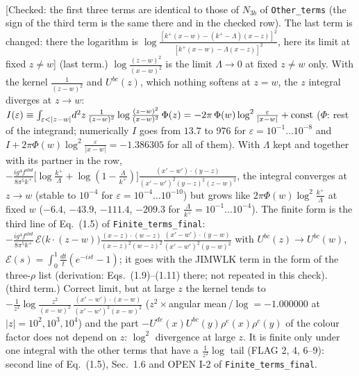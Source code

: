 \documentclass[9pt]{article}
\numberwithin{equation}{section}
\begin{document}
\begin{align}
\end{align} {\color{red}[Checked: the first three terms are identical to those of $N_{3b}$ of \texttt{Other\_terms} (the sign of the third term is the same there and in the checked row). The last term is changed: there the logarithm is $\log\frac{[k^{+}(x-w)-(k^{+}-\Lambda)(x-z)]^{2}}{[k^{+}(x-w)-\Lambda(x-z)]^{2}}$, here its limit at fixed $z\neq w$]} {\color{magenta} (last term.) $\log\frac{(z-w)^{2}}{(x-w)^{2}}$ is the limit $\Lambda\to0$ at fixed $z\neq w$ only. With the kernel $\frac{1}{(z-w)^{2}}$ and $U^{bc}(z)$, which nothing softens at $z=w$, the $z$ integral diverges at $z\to w$: $I(\varepsilon)\equiv\int_{\varepsilon<|z-w|}\!d^{2}z\,\frac{1}{(z-w)^{2}}\log\frac{(z-w)^{2}}{(x-w)^{2}}\,\Phi(z)=-2\pi\,\Phi(w)\log^{2}\frac{\varepsilon}{|x-w|}+{\rm const}$ ($\Phi$: rest of the integrand; numerically $I$ goes from $13.7$ to $976$ for $\varepsilon=10^{-1}\dots10^{-8}$ and $I+2\pi\Phi(w)\log^{2}\frac{\varepsilon}{|x-w|}=-1.386305$ for all of them). With $\Lambda$ kept and together with its partner in the row, $-\frac{ig^{4}f^{abd}}{8\pi^{5}k^{+}}\big[\log\frac{k^{+}}{\Lambda}+\log(1-\frac{\Lambda}{k^{+}})\big]\frac{(x'-w')\cdot(y-z)}{(x'-w')^{2}(y-z)^{2}(z-w)^{2}}$, the integral converges at $z\to w$ (stable to $10^{-4}$ for $\varepsilon=10^{-4}\dots10^{-10}$) but grows like $2\pi\Phi(w)\log^{2}\frac{k^{+}}{\Lambda}$ at fixed $w$ ($-6.4$, $-43.9$, $-111.4$, $-209.3$ for $\frac{\Lambda}{k^{+}}=10^{-1}\dots10^{-4}$). The finite form is the third line of Eq.~(1.5) of \texttt{Finite\_terms\_final}: $-\frac{ig^{4}f^{abd}}{8\pi^{5}k^{+}}\,\mathcal{E}\big(k\cdot(z-w)\big)\frac{(x-z)\cdot(w-z)}{(x-z)^{2}(w-z)^{2}}\frac{(x'-w')\cdot(y-w)}{(x'-w')^{2}(y-w)^{2}}$ with $U^{bc}(z)\to U^{bc}(w)$, $\mathcal{E}(s)=\int_{0}^{1}\frac{dt}{t}(e^{-ist}-1)$; it goes with the JIMWLK term in the form of the three-$\rho$ list (derivation: Eqs.~(1.9)--(1.11) there; not repeated in this check).} {\color{magenta} (third term.) Correct limit, but at large $z$ the kernel tends to $-\frac{1}{z^{2}}\log\frac{z^{2}}{(x-w)^{2}}\,\frac{(x'-w')\cdot(x-w)}{(x'-w')^{2}(x-w)^{2}}$ ($z^{2}\times$angular mean$\,/\log=-1.000000$ at $|z|=10^{2},10^{3},10^{4}$) and the part $-U^{de}(x)U^{bc}(y)\rho^{e}(x)\rho^{c}(y)$ of the colour factor does not depend on $z$: $\log^{2}$ divergence at large $z$. It is finite only under one integral with the other terms that have a $\frac{1}{z^{2}}\log$ tail (FLAG 2, 4, 6--9): second line of Eq.~(1.5), Sec.~1.6 and OPEN I-2 of \texttt{Finite\_terms\_final}.}\par\noindent
\end{document}
